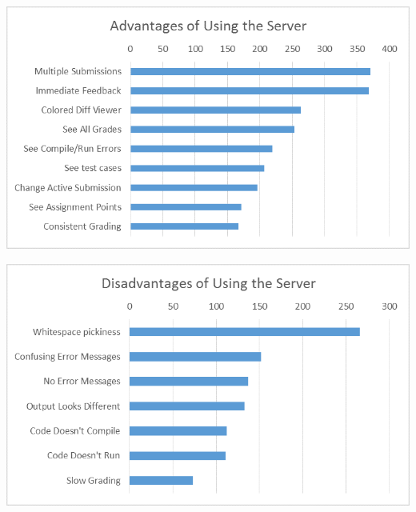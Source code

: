 \documentclass[thesis]{hmcposter}
\begin{document}
\begin{poster}

\begin{center}
\includegraphics[width=11in]{Advantages}
\label{fig:advantages}

\vspace{0.1in}

\includegraphics[width=11in]{Disadvantages}
\label{fig:disadvantages}
\end{center}


\end{poster}
\end{document}
